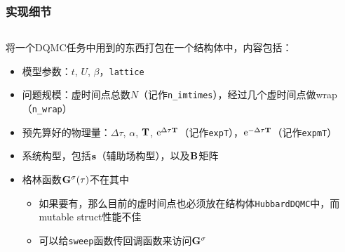 \documentclass[UTF8]{ctexbeamer}
\DeclareMathOperator{\ee}{e}
\begin{document}
\begin{frame}
\frametitle{实现细节}

\begin{columns}

\begin{column}{0.58\textwidth}
    将一个DQMC任务中用到的东西打包在一个结构体中，内容包括：
    \begin{itemize}
        \item 模型参数：$t$, $U$, $\beta$，\texttt{lattice}
        \item 问题规模：虚时间点总数$N$（记作\texttt{n\_imtimes}），经过几个虚时间点做wrap（\texttt{n\_wrap}）
        \item 预先算好的物理量：$\Delta \tau$, $\alpha$, $\vb{T}$, $\ee^{\Delta \tau \vb{T}}$（记作\texttt{expT}），$\ee^{- \Delta \tau \vb{T}}$（记作\texttt{expmT}）
        \item 系统构型，包括$\vb{s}$（辅助场构型），以及$\vb{B}$矩阵
        \item 格林函数$\vb{G}^\sigma(\tau)$不在其中
        \begin{itemize}
            \item 如果要有，那么目前的虚时间点也必须放在结构体\texttt{HubbardDQMC}中，而mutable struct性能不佳
            \item 可以给\texttt{sweep}函数传回调函数来访问$\vb{G}^\sigma$
        \end{itemize}
    \end{itemize}
\end{column}


\end{columns}
\end{frame}
\end{document}
